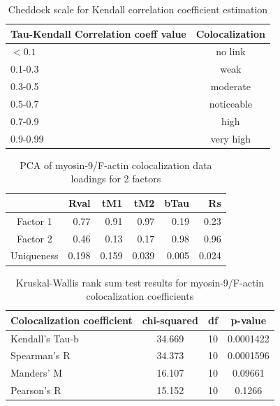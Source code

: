 \documentclass[num-refs]{wiley-article}
\begin{document}
\begin{table}[hbt!]
  \caption{Cheddock scale for Kendall correlation coefficient estimation}
  \label{cheddock}
\centering
\begin{tabular}{l|c|}
  Tau-Kendall Correlation coeff value & Colocalization \\
 \hline
 $ <0.1 $ & no link \\
 0.1-0.3 & weak \\
 0.3-0.5 & moderate \\
 0.5-0.7 & noticeable \\
 0.7-0.9 & high \\
 0.9-0.99 & very high
\end{tabular}
\end{table}

\begin{table}[hbt!]
  \label{tab:pca-M9}
  \caption{PCA of myosin-9/F-actin colocalization data loadings for 2 factors}
\centering
\begin{tabular}{c|rrrrr}
  \hline
  & Rval & tM1 & tM2 & bTau & Rs \\
  \hline
Factor 1 & 0.77 & 0.91 & 0.97 & 0.19 & 0.23 \\
  Factor 2 & 0.46 & 0.13 & 0.17 & 0.98 & 0.96 \\
Uniqueness &  0.198 & 0.159 & 0.039 & 0.005 & 0.024 \\
   \hline
\end{tabular}
\end{table}

\begin{table}[hbt!]
  \caption{Kruskal-Wallis rank sum test results for myosin-9/F-actin colocalization coefficients}
  \label{tab:M9colocs}
\centering
\begin{tabular}{l|ccc}
    \hline
 Colocalization coefficient & chi-squared & df & p-value  \\
   \hline
 Kendall's Tau-b & 34.669 & 10 & 0.0001422 \\
 Spearman's R & 34.373 & 10 &  0.0001596 \\
 Manders' M & 16.107 & 10 & 0.09661 \\
 Pearson's R & 15.152 & 10 & 0.1266
\end{tabular}
\end{table}
\end{document}
